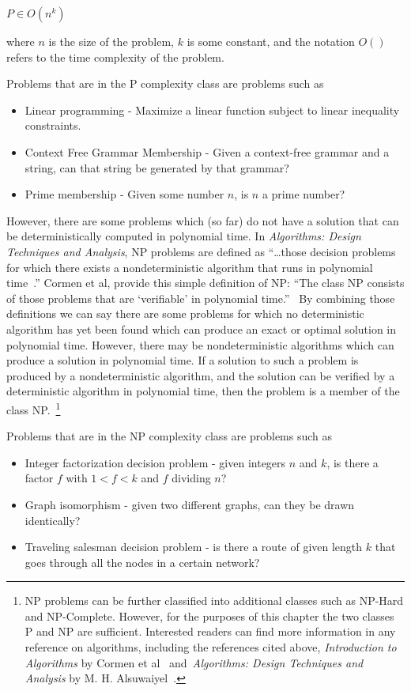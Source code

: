 \(P \in O(n^{k})\)

where \(n\) is the size of the problem, \(k\) is some constant, and the
notation \(O()\) refers to the time complexity of the problem.

Problems that are in the P complexity class are problems such as

\begin{itemize}
\item{Linear programming - Maximize a linear function subject to linear
inequality constraints.} 
\item{Context Free Grammar Membership - Given a context-free grammar and a
string, can that string be generated by that grammar?}
\item {Prime membership - Given some number \(n\), is \(n\) a prime number?}
\end{itemize}

However, there are some problems which (so far) do not have a solution that can
be deterministically computed in polynomial time. In \emph{Algorithms: Design
Techniques and Analysis}, NP problems are defined as ``\ldots those decision
problems for which there exists a nondeterministic algorithm that runs in
polynomial time~\cite{alsuwaiyel1999algorithms}.'' Cormen et al, provide this
simple definition of NP: ``The class NP consists of those problems
that are `verifiable' in polynomial time.''~\cite{Cormen:2009:IAT:1614191} By
combining those definitions we can say there are some problems for which no
deterministic algorithm has yet been found which can produce an exact or optimal
solution in polynomial time. However, there may be nondeterministic algorithms
which can produce a solution in polynomial time. If a solution to such a problem
is produced by a nondeterministic algorithm, and the solution can be verified by
a deterministic algorithm in polynomial time, then the problem is a member of
the class NP.~\footnote{NP problems can be further classified into additional
classes such as NP-Hard and NP-Complete. However, for the purposes of this
chapter the two classes P and NP are sufficient. Interested readers can find
more information in any reference on algorithms, including the references cited
above, \emph{Introduction to Algorithms} by Cormen et
al~\cite{Cormen:2009:IAT:1614191} and~\emph{Algorithms: Design Techniques and
Analysis} by M. H. Alsuwaiyel~\cite{alsuwaiyel1999algorithms}.}

Problems that are in the NP complexity class are problems such as

\begin{itemize}
\item{Integer factorization decision problem - given integers \(n\) and \(k\),
is there a factor \(f\) with \(1 < f < k\) and \(f\) dividing \(n\)?}
\item{Graph isomorphism - given two different graphs, can they be drawn
identically?}
\item{Traveling salesman decision problem - is there a route of given length
\(k\) that goes through all the nodes in a certain network?}
\end{itemize}

